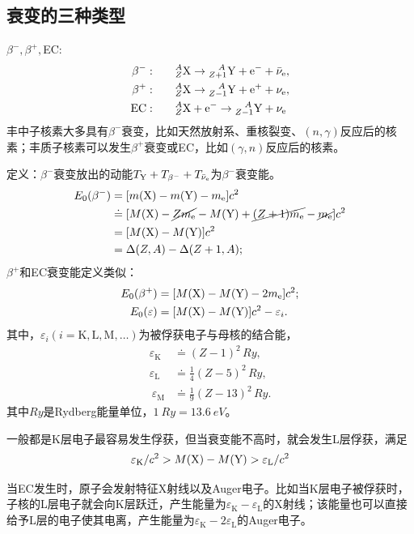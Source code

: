 \subsection{\textbeta 衰变的三种类型}

$\beta^-,\beta^+,$EC:
\begin{align}
	\beta^-:&\qquad{^A_Z\mathrm{X}} \to {^{\quad\!A}_{Z+1}\mathrm{Y}} + \mathrm e^- + \bar\nu_\mathrm e,\\
	\beta^+:&\qquad{^A_Z\mathrm{X}} \to {^{\quad\!A}_{Z-1}\mathrm{Y}} + \mathrm e^+ + \nu_\mathrm e,\\
	\mathrm{EC}:&\qquad{^A_Z\mathrm{X}} + \mathrm e^- \to {^{\quad\!A}_{Z-1}\mathrm{Y}} + \nu_\mathrm e
\end{align}
丰中子核素大多具有$\beta^-$衰变，比如天然放射系、重核裂变、$(n,\gamma)$反应后的核素；丰质子核素可以发生$\beta^+$衰变或EC，比如$(\gamma,n)$反应后的核素。

定义：$\beta^-$衰变放出的动能$T_{\mathrm{Y}}+T_{\beta^-}+T_{\bar\nu_\mathrm e}$为$\beta^-$衰变能。
\begin{align}\notag
	E_0(\beta^-)&=[m(\mathrm{X})-m(\mathrm{Y})-m_\mathrm e]c^2\\\notag
	&\doteq[M(\mathrm{X})-\cancel{Zm_\mathrm e}-M(\mathrm{Y})+\cancel{(Z+1)m_\mathrm e}-\cancel{m_\mathrm e}]c^2\\
	&=[M(\mathrm{X})-M(\mathrm{Y})]c^2\\\notag
	&=\Delta(Z,A)-\Delta(Z+1,A);
\end{align}
$\beta^+$和EC衰变能定义类似：
\begin{align}
	E_0(\beta^+)&=[M(\mathrm{X})-M(\mathrm{Y})-2m_\mathrm e]c^2;\\
	E_0(\varepsilon)&=[M(\mathrm{X})-M(\mathrm{Y})]c^2-\varepsilon_i.
\end{align}
其中，$\varepsilon_i(i=\mathrm{K,L,M,}\ldots)$为被俘获电子与母核的结合能，
\begin{align*}
	\varepsilon_{\mathrm K}&\doteq(Z-1)^2\,\si{Ry},\\
	\varepsilon_{\mathrm L}&\doteq\frac14(Z-5)^2\,\si{Ry},\\\
	\varepsilon_{\mathrm M}&\doteq\frac19(Z-13)^2\,\si{Ry}.
\end{align*}
其中$\si{Ry}$是Rydberg能量单位，$\SI{1}{Ry}=\SI{13.6}{eV}$。

一般都是K层电子最容易发生俘获，但当衰变能不高时，就会发生L层俘获，满足
\[
	\varepsilon_\mathrm K / c^2 > M(\mathrm{X})-M(\mathrm{Y}) > \varepsilon_\mathrm L / c^2
\]

当EC发生时，原子会发射特征X射线以及Auger电子。比如当K层电子被俘获时，子核的L层电子就会向K层跃迁，产生能量为$\varepsilon_\mathrm K - \varepsilon_\mathrm L$的X射线；该能量也可以直接给予L层的电子使其电离，产生能量为$\varepsilon_\mathrm K - 2\varepsilon_{\mathrm L}$的Auger电子。


